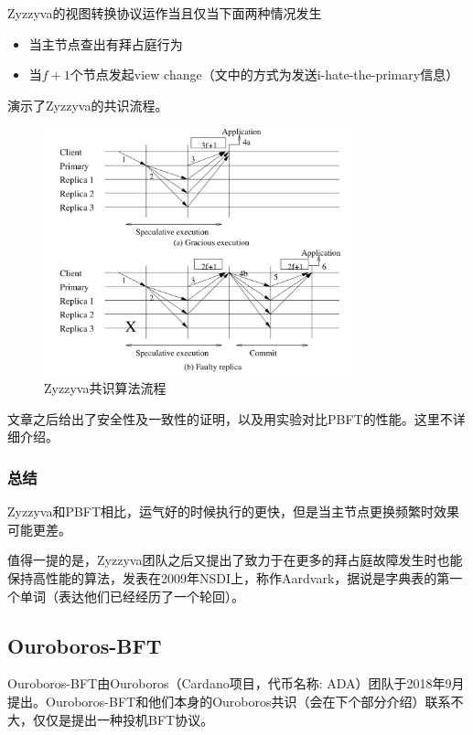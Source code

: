 Zyzzyva的视图转换协议运作当且仅当下面两种情况发生
\begin{itemize}
	\item 当主节点查出有拜占庭行为
	\item 当$f+1$个节点发起view change（文中的方式为发送i-hate-the-primary信息）
\end{itemize}
演示了Zyzzyva的共识流程。

\begin{figure}
	\centering
	\includegraphics[width=0.8\textwidth]{../common/zyzzyva_1.png}
	\caption{Zyzzyva共识算法流程} 
	\label{fig:zyzzyva1}
\end{figure}

文章之后给出了安全性及一致性的证明，以及用实验对比PBFT的性能。这里不详细介绍。

\subsubsection{总结}
Zyzzyva和PBFT相比，运气好的时候执行的更快，但是当主节点更换频繁时效果可能更差。

值得一提的是，Zyzzyva团队之后又提出了致力于在更多的拜占庭故障发生时也能保持高性能的算法，发表在2009年NSDI上\cite{clement2009making}，称作Aardvark，据说是字典表的第一个单词（表达他们已经经历了一个轮回）。

\subsection{Ouroboros-BFT}
Ouroboros-BFT由Ouroboros（Cardano项目，代币名称: ADA）团队于2018年9月提出\cite{kiayias2018ouroboros}。Ouroboros-BFT和他们本身的Ouroboros共识（会在下个部分介绍）联系不大，仅仅是提出一种投机BFT协议。

